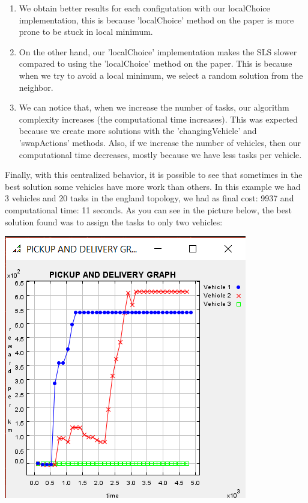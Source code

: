 \documentclass[11pt]{article}
\begin{document}
\begin{enumerate}
\item We obtain better results for each configutation with our localChoice implementation, this is because 'localChoice' method on the paper is more prone to be stuck in local minimum.
\item On the other hand, our 'localChoice' implementation makes the SLS slower compared to using the 'localChoice' method on the paper. This is because when we try to avoid a local minimum, we select a random solution from the neighbor.
\item We can notice that, when we increase the number of tasks, our algorithm complexity increases (the computational time increases). This was expected because we create more solutions with the 'changingVehicle' and 'swapActions' methods. Also, if we increase the number of vehicles, then our computational time decreases, mostly because we have less tasks per vehicle.
\end{enumerate}
\normalsize
Finally, with this centralized behavior, it is possible to see that sometimes in the best solution some vehicles have more work than others. In this example we had 3 vehicles and 20 tasks in the england topology, we had as final cost: 9937 and computational time: 11 seconds. As you can see in the picture below, the best solution found was to assign the tasks to only two vehicles:
\begin{center}
\includegraphics[scale=0.3]{2_vehicl.png}
\end{center}
\end{document}

